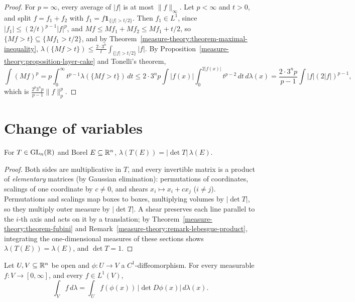 \begin{proof}
For $p = \infty$, every average of $|f|$ is at most $\|f\|_\infty$. Let $p < \infty$ and $t > 0$, and split $f = f_1 + f_2$ with $f_1 = f\mathbf{1}_{\{|f| > t/2\}}$. Then $f_1 \in L^1$,
since $|f_1| \leq (2/t)^{p-1}|f|^p$, and $Mf \leq Mf_1 + Mf_2 \leq Mf_1 + t/2$, so $\{Mf > t\} \subseteq \{Mf_1 > t/2\}$, and by
Theorem~\ref{measure-theory:theorem-maximal-inequality}, $\lambda(\{Mf > t\}) \leq \frac{2 \cdot 3^n}{t}\int_{\{|f| > t/2\}}|f|$. By
Proposition~\ref{measure-theory:proposition-layer-cake} and Tonelli's theorem,
\[
\int(Mf)^p = p\int_0^\infty t^{p-1}\lambda(\{Mf > t\})\,dt \leq 2 \cdot 3^np\int|f(x)|\int_0^{2|f(x)|}t^{p-2}\,dt\,d\lambda(x) = \frac{2 \cdot 3^np}{p - 1}\int|f|(2|f|)^{p-1},
\]
which is $\frac{2^p3^np}{p - 1}\|f\|_p^p$.
\end{proof}

\section{Change of variables}\label{measure-theory:section-change-of-variables}

\begin{lemma}\label{measure-theory:lemma-linear-change}
For $T \in \mathrm{GL}_n(\mathbb{R})$ and Borel $E \subseteq \mathbb{R}^n$, $\lambda(T(E)) = |\det T|\,\lambda(E)$.
\end{lemma}

\begin{proof}
Both sides are multiplicative in $T$, and every invertible matrix is a product of \emph{elementary} matrices (by Gaussian elimination): permutations of coordinates, scalings of one coordinate by
$c \neq 0$, and shears $x_i \mapsto x_i + cx_j$ ($i \neq j$). Permutations and scalings map boxes to boxes, multiplying volumes by $|\det T|$, so they multiply outer measure by $|\det T|$. A shear preserves each
line parallel to the $i$-th axis and acts on it by a translation; by Theorem~\ref{measure-theory:theorem-fubini} and Remark~\ref{measure-theory:remark-lebesgue-product}, integrating the one-dimensional
measures of these sections shows $\lambda(T(E)) = \lambda(E)$, and $\det T = 1$.
\end{proof}

\begin{theorem}\label{measure-theory:theorem-change-of-variables}
Let $U, V \subseteq \mathbb{R}^n$ be open and $\phi \colon U \to V$ a $C^1$-diffeomorphism. For every measurable $f \colon V \to [0, \infty]$, and every $f \in L^1(V)$,
\[
\int_Vf\,d\lambda = \int_Uf(\phi(x))\,|\det D\phi(x)|\,d\lambda(x).
\]
\end{theorem}

